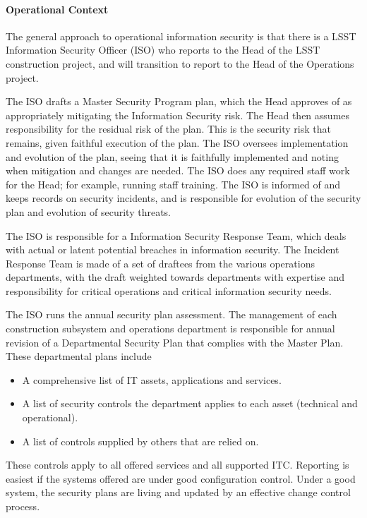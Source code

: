 \paragraph{Operational Context}

The general approach to operational information security is that there is a LSST
Information Security Officer (ISO) who reports to the Head of the LSST
construction project, and will transition to report to the Head of the Operations
project.

The ISO drafts a Master Security Program  plan, which the Head
approves of as appropriately mitigating the Information Security risk. The Head
then assumes responsibility for the residual risk of the plan. This is the
security risk that remains, given faithful execution of the plan. The ISO
oversees implementation and evolution of the plan, seeing that it is faithfully
implemented and noting when mitigation and changes are needed. The ISO does any
required staff work for the Head; for example, running staff training. The ISO
is informed of and keeps records on security incidents, and is responsible for
evolution of the security plan and evolution of security threats.

The ISO is responsible for a Information Security Response Team, which deals
with actual or latent potential breaches in information security. The Incident
Response Team is made of a set of draftees from the various operations
departments, with the draft weighted towards departments with expertise and
responsibility for critical operations and critical information security needs.

 The ISO runs the annual security plan assessment. The management of each
 construction subsystem and operations department is responsible for annual
 revision of a Departmental Security Plan that complies with the Master Plan.
 These departmental plans include

\begin{itemize}
\item A comprehensive list of IT assets, applications and services.
\item A list of security controls the department applies to each asset
(technical and operational).
\item A list of controls supplied by others that are relied on.
\end{itemize}

These controls apply to all offered services and all supported ITC. Reporting
is easiest if the systems offered are under good configuration control. Under a
good system, the security plans are living and updated by an effective change
control process.

